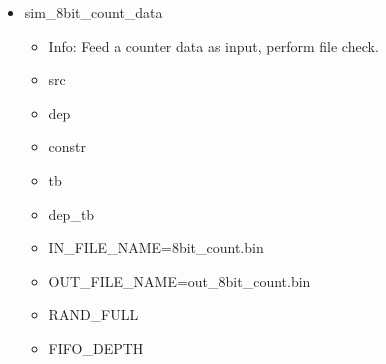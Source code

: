 \begin{itemize}
\begin{itemize}
	\item constr
	\item tb
	\item dep\_tb
	\item IN\_FILE\_NAME=random.bin
	\item OUT\_FILE\_NAME=out\_random.bin
	\item RAND\_FULL=1
	\item FIFO\_DEPTH
	\end{itemize}
\item sim\_8bit\_count\_data
	\begin{itemize}
	\item[$\space$] Info: Feed a counter data as input, perform file check.
	\item src
	\item dep
	\item constr
	\item tb
	\item dep\_tb
	\item IN\_FILE\_NAME=8bit\_count.bin
	\item OUT\_FILE\_NAME=out\_8bit\_count.bin
	\item RAND\_FULL
	\item FIFO\_DEPTH
	\end{itemize}
\end{itemize}
